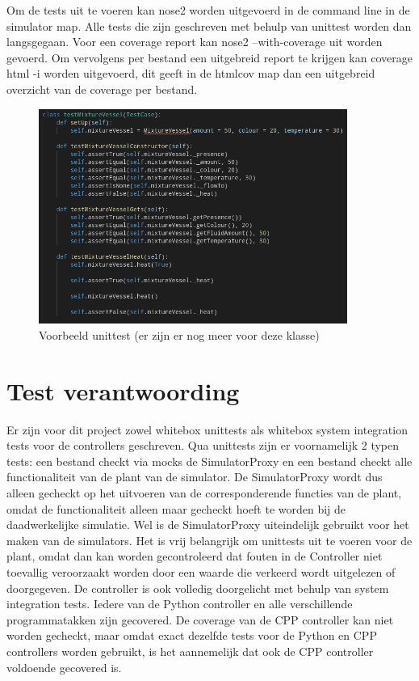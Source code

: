 \documentclass{article}
\begin{document}
    Om de tests uit te voeren kan nose2 worden uitgevoerd in de command line in de simulator map. Alle tests die zijn geschreven met behulp van unittest worden dan langsgegaan. Voor een coverage report kan nose2 --with-coverage uit worden gevoerd. Om vervolgens per bestand een uitgebreid report te krijgen kan coverage html -i worden uitgevoerd, dit geeft in de htmlcov map dan een uitgebreid overzicht van de coverage per bestand.
    
    \begin{figure}[H]
    	\centering
    	\includegraphics[width=0.9\textwidth]{figures/setup.png}
    	\caption{Voorbeeld unittest (er zijn er nog meer voor deze klasse)}
    \end{figure}

	\section{Test verantwoording}
	Er zijn voor dit project zowel whitebox unittests als whitebox system integration tests voor de controllers geschreven. 
	Qua unittests zijn er voornamelijk 2 typen tests: een bestand checkt via mocks de SimulatorProxy en een bestand checkt alle functionaliteit van de plant van de simulator. De SimulatorProxy wordt dus alleen gecheckt op het uitvoeren van de corresponderende functies van de plant, omdat de functionaliteit alleen maar gecheckt hoeft te worden bij de daadwerkelijke simulatie. Wel is de SimulatorProxy uiteindelijk gebruikt voor het maken van de simulators. Het is vrij belangrijk om unittests uit te voeren voor de plant, omdat dan kan worden gecontroleerd dat fouten in de Controller niet toevallig veroorzaakt worden door een waarde die verkeerd wordt uitgelezen of doorgegeven. De controller is ook volledig doorgelicht met behulp van system integration tests. Iedere van de Python controller en alle verschillende programmatakken zijn gecovered. De coverage van de CPP controller kan niet worden gecheckt, maar omdat exact dezelfde tests voor de Python en CPP controllers worden gebruikt, is het aannemelijk dat ook de CPP controller voldoende gecovered is.
	
\end{document}

